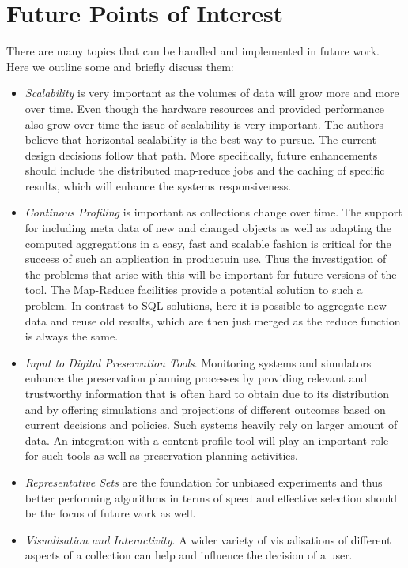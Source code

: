 \section{Future Points of Interest}
There are many topics that can be handled and implemented in future work. Here we outline some and briefly discuss them:
\begin {itemize}
\item \textit{Scalability} is very important as the volumes of data will grow more and more over time. Even though the hardware resources and provided performance also grow over time the issue of scalability is very important. The authors believe that horizontal scalability is the best way to pursue. The current design decisions follow that path. More specifically, future enhancements should include the distributed map-reduce jobs and the caching of specific results, which will enhance the systems responsiveness.

\item \textit{Continous Profiling} is important as collections change over time. The support for including meta data of new and changed objects as well as adapting the computed aggregations in a easy, fast and scalable fashion is critical for the success of such an application in productuin use. Thus the investigation of the problems that arise with this will be important for future versions of the tool. The Map-Reduce facilities provide a potential solution to such a problem. In contrast to SQL solutions, here it is possible to aggregate new data and reuse old results, which are then just merged as the reduce function is always the same.

\item \textit{Input to Digital Preservation Tools}. Monitoring systems and simulators enhance the preservation planning processes by providing relevant and trustworthy information that is often hard to obtain due to its distribution and by offering simulations and projections of different outcomes based on current decisions and policies. Such systems heavily rely on larger amount of data. An integration with a content profile tool will play an important role for such tools as well as preservation planning activities.

\item \textit{Representative Sets} are the foundation for unbiased experiments and thus better performing algorithms in terms of speed and effective selection should be the focus of future work as well. 

\item \textit{Visualisation and Interactivity}. A wider variety of visualisations of different aspects of a collection can help and influence the decision of a user.
\end{itemize}

